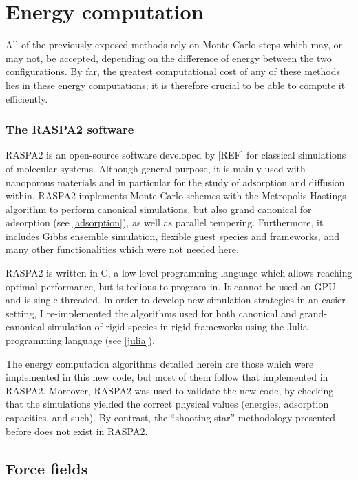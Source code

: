 \documentclass[main.tex]{subfiles}
\begin{document}
\section{Energy computation}\label{energy_computation}

All of the previously exposed methods rely on Monte-Carlo steps which may, or may not, be accepted, depending on the difference of energy between the two configurations. By far, the greatest computational cost of any of these methods lies in these energy computations; it is therefore crucial to be able to compute it efficiently.

\subsubsection{The RASPA2 software}

RASPA2 is an open-source software developed by [REF] for classical simulations of molecular systems. Although general purpose, it is mainly used with nanoporous materials and in particular for the study of adsorption and diffusion within. RASPA2 implements Monte-Carlo schemes with the Metropolis-Hastings algorithm to perform canonical simulations, but also grand canonical for adsorption (see \cref{adsorption}), as well as parallel tempering. Furthermore, it includes Gibbs ensemble simulation, flexible guest species and frameworks, and many other functionalities which were not needed here.

RASPA2 is written in C, a low-level programming language which allows reaching optimal performance, but is tedious to program in. It cannot be used on GPU and is single-threaded. In order to develop new simulation strategies in an easier setting, I re-implemented the algorithms used for both canonical and grand-canonical simulation of rigid species in rigid frameworks using the Julia programming language (see \cref{julia}).

The energy computation algorithms detailed herein are those which were implemented in this new code, but most of them follow that implemented in RASPA2. Moreover, RASPA2 was used to validate the new code, by checking that the simulations yielded the correct physical values (energies, adsorption capacities, and such). By contrast, the ``shooting star'' methodology presented before does not exist in RASPA2.

\subsection{Force fields}
\end{document}
